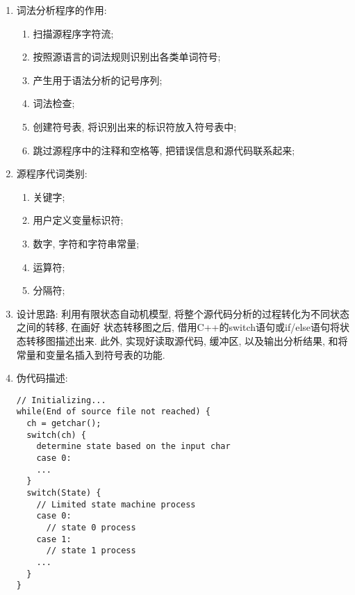 \begin{enumerate}
\item 词法分析程序的作用:
  \begin{enumerate}
  \item 扫描源程序字符流;
  \item 按照源语言的词法规则识别出各类单词符号;
  \item 产生用于语法分析的记号序列;
  \item 词法检查;
  \item 创建符号表, 将识别出来的标识符放入符号表中;
  \item 跳过源程序中的注释和空格等, 把错误信息和源代码联系起来;
  \end{enumerate}
\item 源程序代词类别:
  \begin{enumerate}
    \item 关键字;
    \item 用户定义变量标识符;
    \item 数字, 字符和字符串常量;
    \item 运算符;
    \item 分隔符;
  \end{enumerate}
\item 设计思路:
  利用有限状态自动机模型, 将整个源代码分析的过程转化为不同状态之间的转移, 在画好
  状态转移图之后, 借用C++的switch语句或if/else语句将状态转移图描述出来. 此外, 
  实现好读取源代码, 缓冲区, 以及输出分析结果, 和将常量和变量名插入到符号表的功能.
\item 伪代码描述:
\begin{lstlisting}
// Initializing...
while(End of source file not reached) {
  ch = getchar();
  switch(ch) {
    determine state based on the input char
    case 0:
    ...
  }
  switch(State) {
    // Limited state machine process
    case 0:
      // state 0 process
    case 1:
      // state 1 process
    ...
  }
}
\end{lstlisting}
\end{enumerate}
